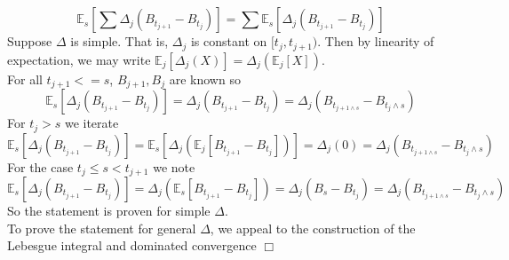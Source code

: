 \documentclass{article}
\begin{document}
\section{}
$$\mathbb{E}_s \left[ \sum \Delta_j (B_{t_{j+1}} - B_{t_j}) \right] = \sum \mathbb{E}_s[\Delta_j(B_{t_{j+1}} - B_{t_j})]$$
Suppose $\Delta$ is simple. That is, $\Delta_j$ is constant on $[t_j, t_{j+1})$. Then by linearity of expectation, we may write $\mathbb{E}_j[\Delta_j(X)] = \Delta_j(\mathbb{E}_j[X])$.\\
For all $t_{j + 1} <= s$, $B_{j+1}, B_j$ are known so
$$\mathbb{E}_s[\Delta_j(B_{t_{j+1}} - B_{t_j})] = \Delta_j(B_{t_{j+1}} - B_{t_j}) = \Delta_j(B_{t_{j+1 \wedge s}} - B_{t_j \wedge s})$$
For $t_j > s$ we iterate
$$\mathbb{E}_s[\Delta_j(B_{t_{j+1}} - B_{t_j})] = \mathbb{E}_s[\Delta_j(\mathbb{E}_j[B_{t_{j+1}} - B_{t_j}])] = \Delta_j(0) = \Delta_j(B_{t_{j+1 \wedge s}} - B_{t_j \wedge s})$$
For the case $t_j \leq s < t_{j + 1}$ we note
$$\mathbb{E}_s[\Delta_j(B_{t_{j+1}} - B_{t_j})] = \Delta_j(\mathbb{E}_s[B_{t_{j+1}} - B_{t_j}]) = \Delta_j(B_s - B_{t_j}) = \Delta_j(B_{t_{j+1 \wedge s}} - B_{t_j \wedge s})$$
So the statement is proven for simple $\Delta$.\\
To prove the statement for general $\Delta$, we appeal to the construction of the Lebesgue integral and dominated convergence $\Box$
\end{document}
